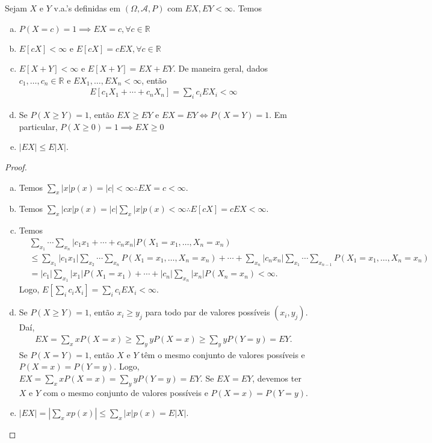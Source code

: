 \documentclass[../Notas.tex]{subfiles}
\begin{document}
\begin{theorem}
Sejam $X$ e $Y$ v.a.'s definidas em $(\Omega, \mathcal{A}, P)$ com $EX, EY < \infty$. Temos
\begin{enumerate}[(a)]
    \item $P(X=c) = 1\implies EX = c, \forall c\in\mathbb{R}$
    \item $E[cX] < \infty$ e $E[cX] = cEX, \forall c\in\mathbb{R}$
    \item $E[X+Y] < \infty$ e $E[X+Y] = EX+EY$. De maneira geral, dados $c_1, \dots, c_n\in\mathbb{R}$ e $EX_1, \dots, EX_n < \infty$, então
    \begin{align*}
        E[c_1X_1 + \cdots + c_nX_n] = \sum_i c_iEX_i < \infty
    \end{align*}
    \item Se $P(X\geq Y) = 1$, então $EX\geq EY$ e $EX = EY\iff P(X=Y) = 1$. Em particular, $P(X\geq 0) = 1 \implies EX \geq 0$
    \item $|EX|\leq E|X|$.
\end{enumerate}
\end{theorem}

\begin{proof}
\begin{enumerate}[(a)]
    \item Temos $\displaystyle{ \sum_x |x|p(x) = |c| < \infty } \therefore EX = c < \infty$.
    \item Temos $\displaystyle{ \sum_x |cx|p(x) = |c|\sum_x |x|p(x) < \infty \therefore E[cX] = cEX < \infty }$.
    \item Temos
    \begin{align*}
        &\sum_{x_1}\cdots\sum_{x_n}|c_1x_1 + \cdots + c_nx_n|P(X_1=x_1, \dots, X_n=x_n) \\
        &\leq \sum_{x_1}|c_1x_1|\sum_{x_2}\cdots\sum_{x_n}P(X_1=x_1, \dots, X_n=x_n) + \cdots + \sum_{x_n}|c_nx_n|\sum_{x_1}\cdots\sum_{x_{n-1}}P(X_1=x_1, \dots, X_n=x_n) \\
        &= |c_1|\sum_{x_1}|x_1|P(X_1=x_1) + \cdots + |c_n|\sum_{x_n}|x_n|P(X_n=x_n) < \infty.
    \end{align*}
    Logo, $\displaystyle{ E\left[ \sum_{i}c_iX_i \right] = \sum_i c_iEX_i < \infty .}$
    
    \item Se $P(X\geq Y) = 1$, então $x_i\geq y_j$ para todo par de valores possíveis $(x_i, y_j)$. Daí,
    \begin{align*}
        EX = \sum_x xP(X=x) \geq \sum_y yP(X=x) \geq \sum_y yP(Y=y) = EY.
    \end{align*}
    Se $P(X=Y) = 1$, então $X$ e $Y$ têm o mesmo conjunto de valores possíveis e $P(X=x) = P(Y=y)$. Logo, $EX = \sum_x xP(X=x) = \sum_y yP(Y=y) = EY$. Se $EX=EY$, devemos ter $X$ e $Y$ com o mesmo conjunto de valores possíveis e $P(X=x) = P(Y=y)$.
    
    \item $\displaystyle{|EX| = \left| \sum_x xp(x) \right| \leq \sum_x |x|p(x) = E|X|}$.
\end{enumerate}
\end{proof}
\end{document}
